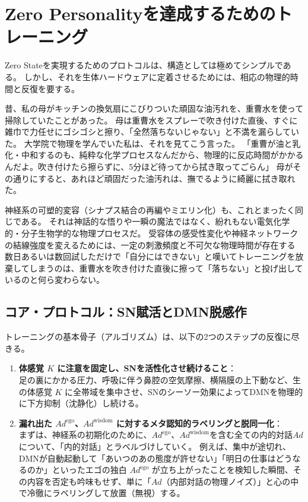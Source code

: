 \section{Zero Personalityを達成するためのトレーニング}

Zero Stateを実現するためのプロトコルは、構造としては極めてシンプルである。
しかし、それを生体ハードウェアに定着させるためには、相応の物理的時間と反復を要する。

昔、私の母がキッチンの換気扇にこびりついた頑固な油汚れを、重曹水を使って掃除していたことがあった。
母は重曹水をスプレーで吹き付けた直後、すぐに雑巾で力任せにゴシゴシと擦り、「全然落ちないじゃない」と不満を漏らしていた。
大学院で物理を学んでいた私は、それを見てこう言った。
「重曹が油と乳化・中和するのも、純粋な化学プロセスなんだから、物理的に反応時間がかかるんだよ。吹き付けたら擦らずに、5分ほど待ってから拭き取ってごらん」
母がその通りにすると、あれほど頑固だった油汚れは、撫でるように綺麗に拭き取れた。

神経系の可塑的変容（シナプス結合の再編やミエリン化）も、これとまったく同じである。
それは神話的な悟りや一瞬の魔法ではなく、紛れもない電気化学的・分子生物学的な物理プロセスだ。
受容体の感受性変化や神経ネットワークの結線強度を変えるためには、一定の刺激頻度と不可欠な物理時間が存在する
数日あるいは数回試しただけで「自分にはできない」と嘆いてトレーニングを放棄してしまうのは、重曹水を吹き付けた直後に擦って「落ちない」と投げ出しているのと何ら変わらない。

\subsection{コア・プロトコル：SN賦活とDMN脱感作}

トレーニングの基本骨子（アルゴリズム）は、以下の2つのステップの反復に尽きる。
\begin{enumerate}[label=(\arabic*)]
  \item \textbf{体感覚 $K$ に注意を固定し、SNを活性化させ続けること}：\\
  足の裏にかかる圧力、呼吸に伴う鼻腔の空気摩擦、横隔膜の上下動など、生の体感覚 $K$ に全帯域を集中させ、SNのシーソー効果によってDMNを物理的に下方抑制（沈静化）し続ける。
  \item \textbf{漏れ出た $Ad^{\mathrm{ego}}$、$Ad^{\mathrm{wisdom}}$ に対するメタ認知的ラベリングと脱同一化}：\\
  まずは、神経系の初期化のために、$Ad^{\mathrm{ego}}$、$Ad^{\mathrm{wisdom}}$を含む全ての内的対話$Ad$について、「内的対話」とラベルづけしていく。
  例えば、集中が途切れ、DMNが自動起動して「あいつのあの態度が許せない」「明日の仕事はどうなるのか」といったエゴの独白 $Ad^{\mathrm{ego}}$ が立ち上がったことを検知した瞬間、その内容を否定も吟味もせず、単に「$Ad$（内部対話の物理ノイズ）」と心の中で冷徹にラベリングして放置（無視）する。
\end{enumerate}

